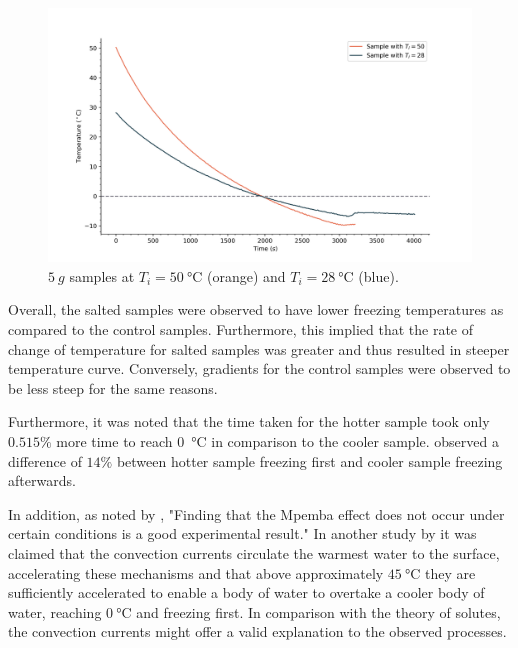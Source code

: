 \documentclass[../main.tex]{subfiles}
\begin{document}
\begin{figure}[H]
    \centering
    \includegraphics[scale=0.6]{figures/5GSamples.png}
    \caption{$\SI{5}{g}$ samples at $T_i = \SI{50}{\celsius}$ (orange) and $T_i = \SI{28}{\celsius}$ (blue).}
    \label{fig:5GSamples}
\end{figure}

Overall, the salted samples were observed to have lower freezing temperatures as compared to the control samples. Furthermore, this implied that the rate of change of temperature for salted samples was greater and thus resulted in steeper temperature curve. Conversely, gradients for the control samples were observed to be less steep for the same reasons. \par

Furthermore, it was noted that the time taken for the hotter sample took only $0.515\% $ more time to reach \SI{0}{\celsius} in comparison to the cooler sample. \textcite{ibekwe_investigating_2016} observed a difference of $14\%$ between hotter sample freezing first and cooler sample freezing afterwards.

In addition, as noted by \textcite{jeng_mpemba_2006}, "Finding that the Mpemba effect does not occur under certain conditions is a good experimental result." In another study by \textcite{ibekwe_investigating_2016} it was claimed that the convection currents circulate the warmest water to the surface, accelerating these mechanisms and that above approximately $\SI{45}{\celsius}$ they are sufficiently accelerated to enable a body of water to overtake a cooler body of water, reaching $\SI{0}{\celsius}$ and freezing first. In comparison with the theory of solutes, the convection currents might offer a valid explanation to the observed processes. \par 
\end{document}
